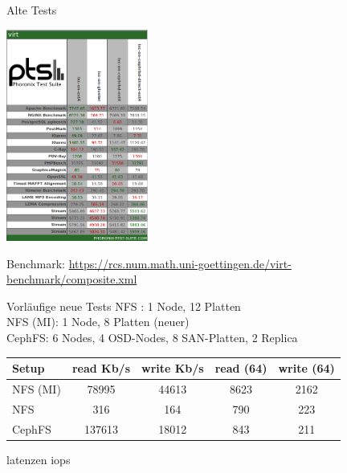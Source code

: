\documentclass[hyperref={xetex}]{beamer}
\begin{document}
\begin{frame}[fragile]{Alte Tests}
	\begin{center}
	\includegraphics[width=0.35\textwidth]{images/phoronixtest.png}
	\end{center}

  Benchmark: \url{https://rcs.num.math.uni-goettingen.de/virt-benchmark/composite.xml}
\end{frame}

\begin{frame}[fragile]{Vorläufige neue Tests} 
  \alert{NFS }: 1 Node, 12 Platten \\
  \alert{NFS (MI)}: 1 Node, 8 Platten (neuer) \\
  \alert{CephFS}:  6 Nodes, 4 OSD-Nodes, 8 SAN-Platten, 2 Replica
    \begin{center}
    \begin{tabular}[c]{|l|c|c|c|c|}
      \hline
    Setup &  read Kb/s & write Kb/s & read (64) & write (64) \\
    \hline\hline
    NFS (MI) & 78995 & 44613 & 8623 & 2162 \\ 
    NFS & 316 & 164 &  790 & 223 \\
    CephFS & 137613 & 18012 & 843 & 211 \\
    \hline
    \end{tabular}
  \end{center}
latenzen
iops


\end{frame}
\end{document}
